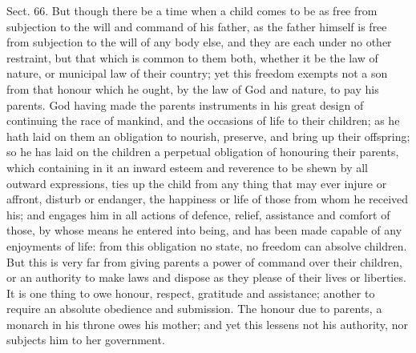 \documentclass[11pt,openany]{book}
\begin{document}
Sect. 66. But though there be a time when a child comes to be as free from subjection to the will and command of his father, as the father himself is free from subjection to the will of any body else, and they are each under no other restraint, but that which is common to them both, whether it be the law of nature, or municipal law of their country; yet this freedom exempts not a son from that honour which he ought, by the law of God and nature, to pay his parents. God having made the parents instruments in his great design of continuing the race of mankind, and the occasions of life to their children; as he hath laid on them an obligation to nourish, preserve, and bring up their offspring; so he has laid on the children a perpetual obligation of honouring their parents, which containing in it an inward esteem and reverence to be shewn by all outward expressions, ties up the child from any thing that may ever injure or affront, disturb or endanger, the happiness or life of those from whom he received his; and engages him in all actions of defence, relief, assistance and comfort of those, by whose means he entered into being, and has been made capable of any enjoyments of life: from this obligation no state, no freedom can absolve children. But this is very far from giving parents a power of command over their children, or an authority to make laws and dispose as they please of their lives or liberties. It is one thing to owe honour, respect, gratitude and assistance; another to require an absolute obedience and submission. The honour due to parents, a monarch in his throne owes his mother; and yet this lessens not his authority, nor subjects him to her government.
\end{document}

